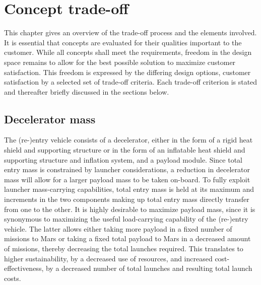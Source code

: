 \section{Concept trade-off}
\label{ch:tradeoff}
This chapter gives an overview of the trade-off process and the elements involved. It is essential that concepts are evaluated for their qualities important to the customer. While all concepts shall meet the requirements, freedom in the design space remains to allow for the best possible solution to maximize customer satisfaction. This freedom is expressed by the differing design options, customer satisfaction by a selected set of trade-off criteria. Each trade-off criterion is stated and thereafter briefly discussed in the sections below.

\subsection{Decelerator mass}\label{subsub:decelmass}
The (re-)entry vehicle consists of a decelerator, either in the form of a rigid heat shield and supporting structure or in the form of an inflatable heat shield and supporting structure and inflation system, and a payload module. Since total entry mass is constrained by launcher considerations, a reduction in decelerator mass will allow for a larger payload mass to be taken on-board. To fully exploit launcher mass-carrying capabilities, total entry mass is held at its maximum and increments in the two components making up total entry mass directly transfer from one to the other. It is highly desirable to maximize payload mass, since it is synonymous to maximizing the useful load-carrying capability of the (re-)entry vehicle. The latter allows either taking more payload in a fixed number of missions to Mars or taking a fixed total payload to Mars in a decreased amount of missions, thereby decreasing the total launches required. This translates to higher sustainability, by a decreased use of resources, and increased cost-effectiveness, by a decreased number of total launches and resulting total launch costs.

